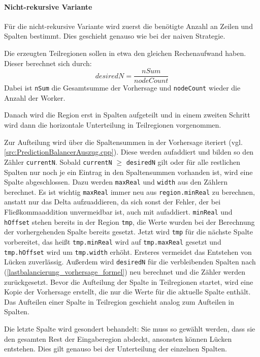 \paragraph*{Nicht-rekursive Variante}\label{lastbalancierung_vorhersage}
Für die nicht-rekursive Variante wird zuerst die benötigte Anzahl an Zeilen und Spalten bestimmt.
Dies geschieht genauso wie bei der naiven Strategie.

Die erzeugten Teilregionen sollen in etwa den gleichen Rechenaufwand haben. Dieser berechnet sich durch:
\begin{equation}\label{lastbalancierung_vorhersage_formel}
	desiredN = \frac{nSum}{nodeCount}
\end{equation}
Dabei ist \verb|nSum| die Gesamtsumme der Vorhersage und \verb|nodeCount| wieder die Anzahl der Worker.

Danach wird die Region erst in Spalten aufgeteilt und in einem zweiten Schritt wird dann die horizontale Unterteilung in Teilregionen vorgenommen.

Zur Aufteilung wird über die Spaltensummen in der Vorhersage iteriert (vgl. \autoref{src:PredictionBalancerAuszug.cpp}). Diese werden aufaddiert und bilden so den Zähler \verb|currentN|.
Sobald \verb|currentN| $\geq$ \verb|desiredN| gilt oder für alle restlichen Spalten nur noch je ein Eintrag in den Spaltensummen vorhanden ist, wird eine Spalte abgeschlossen.
Dazu werden \verb|maxReal| und \verb|width| aus den Zählern berechnet. Es ist wichtig \verb|maxReal| immer neu aus \verb|region.minReal| zu berechnen, anstatt nur das Delta aufzuaddieren, da sich sonst der Fehler, der bei Fließkommaaddition unvermeidbar ist, auch mit aufaddiert. \verb|minReal| und \verb|hOffset| stehen bereits in der Region \verb|tmp|, die Werte wurden bei der Berechnung der vorhergehenden Spalte bereits gesetzt.
Jetzt wird \verb|tmp| für die nächste Spalte vorbereitet, das heißt \verb|tmp.minReal| wird auf \verb|tmp.maxReal| gesetzt und \verb|tmp.hOffset| wird um \verb|tmp.width| erhöht. Ersteres vermeidet das Entstehen von Lücken zuverlässig.
Außerdem wird \verb|desiredN| für die verbleibenden Spalten nach (\ref{lastbalancierung_vorhersage_formel}) neu berechnet und die Zähler werden zurückgesetzt.
Bevor die Aufteilung der Spalte in Teilregionen startet, wird eine Kopie der Vorhersage erstellt, die nur die Werte für die aktuelle Spalte enthält.
Das Aufteilen einer Spalte in Teilregion geschieht analog zum Aufteilen in Spalten.

Die letzte Spalte wird gesondert behandelt: Sie muss so gewählt werden, dass sie den gesamten Rest der Eingaberegion abdeckt, ansonsten können Lücken entstehen.
Dies gilt genauso bei der Unterteilung der einzelnen Spalten.

